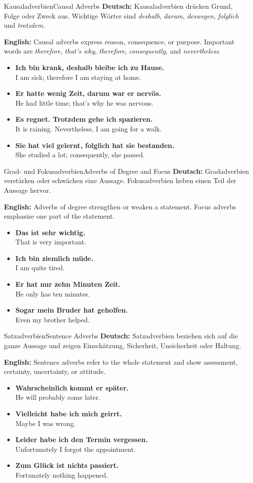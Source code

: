 \documentclass[a4paper,11pt]{article}
\newcommand{\GermanText}[1]{\textbf{Deutsch: }#1\par}
\newcommand{\EnglishText}[1]{{\color{SoftGray}\textbf{English: }#1\par}}
\newcommand{\ExampleItem}[2]{\item \textbf{#1}\\{\color{SoftGray}#2}}
\begin{document}
\begin{grammarentry}{Kausaladverbien}{Causal Adverbs}
    \GermanText{Kausaladverbien drücken Grund, Folge oder Zweck aus. Wichtige Wörter sind \textit{deshalb}, \textit{darum}, \textit{deswegen}, \textit{folglich} und \textit{trotzdem}.}
    \EnglishText{Causal adverbs express reason, consequence, or purpose. Important words are \textit{therefore}, \textit{that's why}, \textit{therefore}, \textit{consequently}, and \textit{nevertheless}.}
    \begin{exbox}
        \begin{itemize}
            \ExampleItem{Ich bin krank, deshalb bleibe ich zu Hause.}{I am sick; therefore I am staying at home.}
            \ExampleItem{Er hatte wenig Zeit, darum war er nervös.}{He had little time; that's why he was nervous.}
            \ExampleItem{Es regnet. Trotzdem gehe ich spazieren.}{It is raining. Nevertheless, I am going for a walk.}
            \ExampleItem{Sie hat viel gelernt, folglich hat sie bestanden.}{She studied a lot; consequently, she passed.}
        \end{itemize}
    \end{exbox}
\end{grammarentry}

\begin{grammarentry}{Grad- und Fokusadverbien}{Adverbs of Degree and Focus}
    \GermanText{Gradadverbien verstärken oder schwächen eine Aussage. Fokusadverbien heben einen Teil der Aussage hervor.}
    \EnglishText{Adverbs of degree strengthen or weaken a statement. Focus adverbs emphasize one part of the statement.}
    \begin{exbox}
        \begin{itemize}
            \ExampleItem{Das ist sehr wichtig.}{That is very important.}
            \ExampleItem{Ich bin ziemlich müde.}{I am quite tired.}
            \ExampleItem{Er hat nur zehn Minuten Zeit.}{He only has ten minutes.}
            \ExampleItem{Sogar mein Bruder hat geholfen.}{Even my brother helped.}
        \end{itemize}
    \end{exbox}
\end{grammarentry}

\begin{grammarentry}{Satzadverbien}{Sentence Adverbs}
    \GermanText{Satzadverbien beziehen sich auf die ganze Aussage und zeigen Einschätzung, Sicherheit, Unsicherheit oder Haltung.}
    \EnglishText{Sentence adverbs refer to the whole statement and show assessment, certainty, uncertainty, or attitude.}
    \begin{exbox}
        \begin{itemize}
            \ExampleItem{Wahrscheinlich kommt er später.}{He will probably come later.}
            \ExampleItem{Vielleicht habe ich mich geirrt.}{Maybe I was wrong.}
            \ExampleItem{Leider habe ich den Termin vergessen.}{Unfortunately I forgot the appointment.}
            \ExampleItem{Zum Glück ist nichts passiert.}{Fortunately nothing happened.}
        \end{itemize}
    \end{exbox}
\end{grammarentry}
\end{document}
